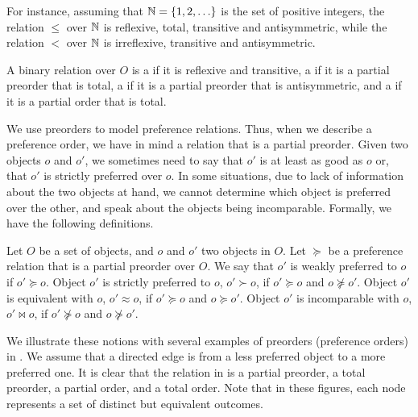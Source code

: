 For instance, assuming that $\mathbb{N}=\{1,2,\ldots\}$ is the set of positive integers,
the  relation $\leq$ over $\mathbb{N}$ is reflexive,
total, transitive and antisymmetric, while the  relation
$<$ over $\mathbb{N}$ is irreflexive, transitive and antisymmetric.


\begin{definition}
\label{def:orders}
	A binary relation over $O$ is a  if it is reflexive and transitive,
	a  if it is a partial preorder that is total,
	a  if it is a partial preorder that is antisymmetric,
	and a  if it is a partial order that is total.
\end{definition}

We use preorders to model preference relations.
Thus, when we describe a preference order, we have in mind a relation
that is a partial preorder.
Given two objects $o$ and $o'$,
we sometimes need to say that $o'$ is at least as good as $o$ or,
that $o'$ is strictly preferred over $o$.
In some situations, due to 
lack of information about the two objects at hand, we
cannot determine which object is preferred over the other, and
speak about the objects being incomparable.
Formally, we have the following definitions.
\begin{definition}
	Let $O$ be a set of objects, and $o$ and $o'$ two objects in $O$.
	Let $\succeq$ be a preference relation that is a partial preorder	over $O$.
	We say that $o'$ is weakly preferred to $o$ if $o' \succeq o$.
	Object $o'$ is strictly preferred to $o$, $o' \succ o$, if $o' \succeq o$ and $o \not \succeq o'$.
	Object $o'$ is equivalent with $o$, $o' \approx o$, if $o' \succeq o$ and $o \succeq o'$.
	Object $o'$ is incomparable with $o$, $o' \bowtie o$, if $o' \not \succeq o$ and $o \not \succeq o'$.
\end{definition}

We illustrate these notions with several examples of preorders (preference orders)
in .
We assume that a directed edge is from a less preferred object to
a more preferred one.
It is clear that the relation in  is a partial 
preorder,  a total preorder,  a partial
order, and  a total order.
Note that in these figures,
each node represents a set of distinct but equivalent outcomes.

